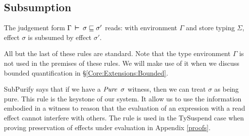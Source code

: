 \clearpage{}
\subsection{Subsumption}

\bigskip
{}

\bigskip

The judgement form $\Gamma \hspace{2pt} \boldsymbol{\vdash} \hspace{2pt} \sigma \sqsubseteq \sigma'$ reads: with environment $\Gamma$ and store typing $\Sigma$, effect $\sigma$ is subsumed by effect $\sigma'$. 

All but the last of these rules are standard. Note that the type environment $\Gamma$ is not used in the premises of these rules. We will make use of it when we discuss bounded quantification in \S\ref{Core:Extensions:Bounded}.

SubPurify says that if we have a $\iPure \ \sigma$ witness, then we can treat $\sigma$ as being pure. This rule is the keystone of our system. It allow us to use the information embodied in a witness to reason that the evaluation of an expression with a read effect cannot interfere with others. The rule is used in the TySuspend case when proving preservation of effects under evaluation in Appendix \ref{proofs}. 

